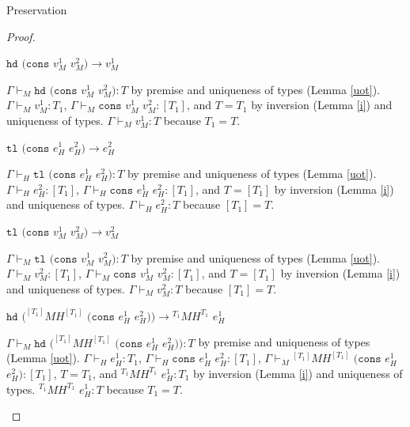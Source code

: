 \begin{theorem}{Preservation}
\begin{proof}

\begin{case}
$\mathtt{hd}$ $(\mathtt{cons}$ $v_{M}^{1}$ $v_{M}^{2})\rightarrow v_{M}^{1}$

$\Gamma\vdash_{M}\mathtt{hd}$ $(\mathtt{cons}$ $v_{M}^{1}$ $v_{M}^{2}):T$ by premise and uniqueness of types (Lemma \ref{uot}).  $\Gamma\vdash_{M}v_{M}^{1}:T_{1}$, $\Gamma\vdash_{M}\mathtt{cons}$ $v_{M}^{1}$ $v_{M}^{2}:[T_{1}]$, and $T=T_{1}$ by inversion (Lemma \ref{i}) and uniqueness of types.  $\Gamma\vdash_{M}v_{M}^{1}:T$ because $T_{1}=T$.
\end{case}


\begin{case}
$\mathtt{tl}$ $(\mathtt{cons}$ $e_{H}^{1}$ $e_{H}^{2})\rightarrow e_{H}^{2}$

$\Gamma\vdash_{H}\mathtt{tl}$ $(\mathtt{cons}$ $e_{H}^{1}$ $e_{H}^{2}):T$ by premise and uniqueness of types (Lemma \ref{uot}).  $\Gamma\vdash_{H}e_{H}^{2}:[T_{1}]$, $\Gamma\vdash_{H}\mathtt{cons}$ $e_{H}^{1}$ $e_{H}^{2}:[T_{1}]$, and $T=[T_{1}]$ by inversion (Lemma \ref{i}) and uniqueness of types.  $\Gamma\vdash_{H}e_{H}^{2}:T$ because $[T_{1}]=T$.
\end{case}


\begin{case}
$\mathtt{tl}$ $(\mathtt{cons}$ $v_{M}^{1}$ $v_{M}^{2})\rightarrow v_{M}^{2}$

$\Gamma\vdash_{M}\mathtt{tl}$ $(\mathtt{cons}$ $v_{M}^{1}$ $v_{M}^{2}):T$ by premise and uniqueness of types (Lemma \ref{uot}).  $\Gamma\vdash_{M}v_{M}^{2}:[T_{1}]$, $\Gamma\vdash_{M}\mathtt{cons}$ $v_{M}^{1}$ $v_{M}^{2}:[T_{1}]$, and $T=[T_{1}]$ by inversion (Lemma \ref{i}) and uniqueness of types.  $\Gamma\vdash_{M}v_{M}^{2}:T$ because $[T_{1}]=T$.
\end{case}


\begin{case}
$\mathtt{hd}$ $(^{[T_{1}]}MH^{[T_{1}]}$ $(\mathtt{cons}$ $e_{H}^{1}$ $e_{H}^{2}))\rightarrow{^{T_{1}}M}H^{T_{1}}$ $e_{H}^{1}$

$\Gamma\vdash_{M}\mathtt{hd}$ $(^{[T_{1}]}MH^{[T_{1}]}$ $(\mathtt{cons}$ $e_{H}^{1}$ $e_{H}^{2})):T$ by premise and uniqueness of types (Lemma \ref{uot}).  $\Gamma\vdash_{H}e_{H}^{1}:T_{1}$, $\Gamma\vdash_{H}\mathtt{cons}$ $e_{H}^{1}$ $e_{H}^{2}:[T_{1}]$, $\Gamma\vdash_{M}{^{[T_{1}]}M}H^{[T_{1}]}$ $(\mathtt{cons}$ $e_{H}^{1}$ $e_{H}^{2}):[T_{1}]$, $T=T_{1}$, and $^{T_{1}}MH^{T_{1}}$ $e_{H}^{1}:T_{1}$ by inversion (Lemma \ref{i}) and uniqueness of types.  $^{T_{1}}MH^{T_{1}}$ $e_{H}^{1}:T$ because $T_{1}=T$.
\end{case}


\end{proof}
\end{theorem}
